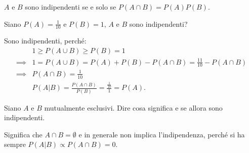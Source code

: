 \begin{exercise}
	$A$ e $B$ sono indipendenti se e solo se $P(A\cap B) = P(A)P(B)$.
\end{exercise}

\begin{exercise}
	Siano $P(A)=\frac1{10}$ e $P(B)=1$, $A$ e $B$ sono indipendenti?
\end{exercise}

\begin{solution}
	Sono indipendenti, perché:
	\begin{align*}
		&1 \ge P(A\cup B) \ge P(B) = 1 \\
		\implies &1 = P(A\cup B) = P(A) + P(B) - P(A\cap B) = \frac{11}{10} - P(A\cap B) \\
		\implies &P(A\cap B) = \frac{1}{10} \\
		&P(A|B) = \frac{P(A\cap B)}{P(B)} = \frac{\frac{1}{10}}{1} = P(A).
	\end{align*}
\end{solution}

\begin{exercise}
	Siano $A$ e $B$ mutualmente esclusivi. Dire cosa significa e se allora sono indipendenti.
\end{exercise}

\begin{solution}
	Significa che $A\cap B=\emptyset$ e in generale non implica l'indipendenza, perché si ha sempre $P(A|B)\propto P(A\cap B)=0$.
\end{solution}
